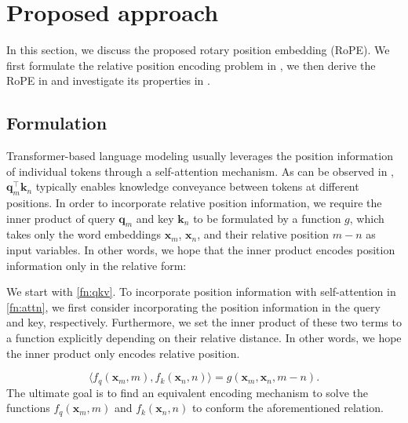 \documentclass{article}
\def\q{{\boldsymbol q}}
\def\k{{\boldsymbol k}}
\def\x{{\boldsymbol x}}
\begin{document}
\section{Proposed approach}
\label{sec:approach}
In this section, we discuss the proposed rotary position embedding (RoPE). We first formulate the relative position encoding problem in  , we then derive the RoPE in  and investigate its properties in  . 

\subsection{Formulation}
\label{sec:formulation}
Transformer-based language modeling usually leverages the position information of individual tokens through a self-attention mechanism. As can be observed in , $\q_m^{\intercal}\k_n$ typically enables knowledge conveyance between tokens at different positions. In order to incorporate relative position information, we require the inner product of query $\q_m$ and key $\k_n$ to be formulated by a function $g$, which takes only the word embeddings $\x_m$, $\x_n$, and their relative position $m -n$ as input variables. In other words, we hope that the inner product encodes position information only in the relative form:

\if We start with \cref{fn:qkv}. To incorporate position information with self-attention in \cref{fn:attn}, we first consider incorporating the position information in the query and key, respectively.  Furthermore, we set the inner product of these two terms to a function explicitly depending on their relative distance. In other words, we hope the inner product only encodes relative position. \fi


\begin{equation}
	\langle f_q(\x_m, m),f_k(\x_n, n)\rangle=g(\x_m,\x_n,m-n).
	\label{fn:formulation}
\end{equation}
The ultimate goal is to find an equivalent encoding mechanism to solve the functions $f_q(\x_m, m)$ and $f_k(\x_n, n)$ to conform the aforementioned relation. 
\end{document}
